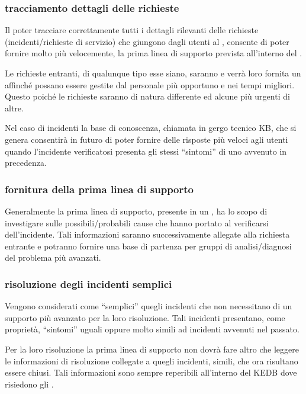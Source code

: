 \subsubsection[Tracciamento dettagli delle richieste]{tracciamento dettagli delle richieste}
Il poter tracciare correttamente tutti i dettagli rilevanti delle richieste (incidenti/richieste di servizio) che giungono dagli utenti al , consente di poter fornire molto più velocemente, la prima linea di supporto prevista all'interno del .

Le richieste entranti, di qualunque tipo esse siano, saranno  e verrà loro fornita un  affinché possano essere gestite dal personale più opportuno e nei tempi migliori. Questo poiché le richieste saranno di natura differente ed alcune più urgenti di altre.

Nel caso di incidenti la base di conoscenza, chiamata in gergo tecnico \ac{KB}, che si genera consentirà in futuro di poter fornire delle risposte più veloci agli utenti quando l'incidente verificatosi presenta gli stessi ``sintomi'' di uno avvenuto in precedenza.

\subsubsection[Fornitura della prima linea di supporto]{fornitura della prima linea di supporto}
Generalmente la prima linea di supporto, presente in un , ha lo scopo di investigare sulle possibili/probabili cause che hanno portato al verificarsi dell'incidente. Tali informazioni saranno successivamente allegate alla richiesta entrante e potranno fornire una base di partenza per gruppi di analisi/diagnosi del problema più avanzati.

\subsubsection[Risoluzione degli incidenti semplici]{risoluzione degli incidenti semplici}
Vengono considerati come ``semplici'' quegli incidenti che non necessitano di un supporto più avanzato per la loro risoluzione. Tali incidenti presentano, come proprietà, ``sintomi'' uguali oppure molto simili ad incidenti avvenuti nel passato.

Per la loro risoluzione la prima linea di supporto non dovrà fare altro che leggere le informazioni di risoluzione collegate a quegli incidenti, simili, che ora risultano essere chiusi. Tali informazioni sono sempre reperibili all'interno del \ac{KEDB} dove risiedono gli .

